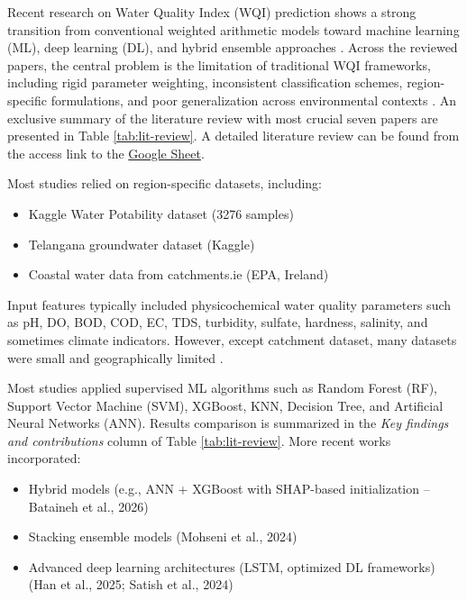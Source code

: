 \documentclass[conference]{IEEEtran}
\begin{document}
Recent research on Water Quality Index (WQI) prediction shows a strong transition from conventional weighted arithmetic models toward machine learning (ML), deep learning (DL), and hybrid ensemble approaches \cite{mo2024assessment}. Across the reviewed papers, the central problem is the limitation of traditional WQI frameworks, including rigid parameter weighting, inconsistent classification schemes, region-specific formulations, and poor generalization across environmental contexts \cite{zhu2022review, ehteram2024advanced}. An exclusive summary of the literature review with most crucial seven papers are presented in Table \ref{tab:lit-review}. A detailed literature review can be found from the access link to the \href{https://docs.google.com/spreadsheets/d/1uNeQQFx8vY5-hyzwO9BjR6l4s6zKMueg/edit?usp=sharing\&ouid=106348839836730303077\&rtpof=true\&sd=true}{Google Sheet}.

Most studies relied on region-specific datasets, including:

\begin{itemize}
    \item Kaggle Water Potability dataset (3276 samples)
    \item Telangana groundwater dataset (Kaggle)
    \item Coastal water data from catchments.ie (EPA, Ireland)
\end{itemize}

Input features typically included physicochemical water quality parameters such as pH, DO, BOD, COD, EC, TDS, turbidity, sulfate, hardness, salinity, and sometimes climate indicators. However, except catchment dataset, many datasets were small and geographically limited \cite{uddin2023performance, singh2024predictive}.

Most studies applied supervised ML algorithms such as Random Forest (RF), Support Vector Machine (SVM), XGBoost, KNN, Decision Tree, and Artificial Neural Networks (ANN). Results comparison is summarized in the \textit{Key findings and contributions} column of Table \ref{tab:lit-review}. More recent works incorporated:

\begin{itemize}
    \item Hybrid models (e.g., ANN + XGBoost with SHAP-based initialization – Bataineh et al., 2026) \cite{al2026hybrid}
    \item Stacking ensemble models (Mohseni et al., 2024) \cite{mohseni2024prediction}
    \item Advanced deep learning architectures (LSTM, optimized DL frameworks) (Han et al., 2025; Satish et al., 2024) \cite{satish2024performance}
\end{itemize}
\end{document}
